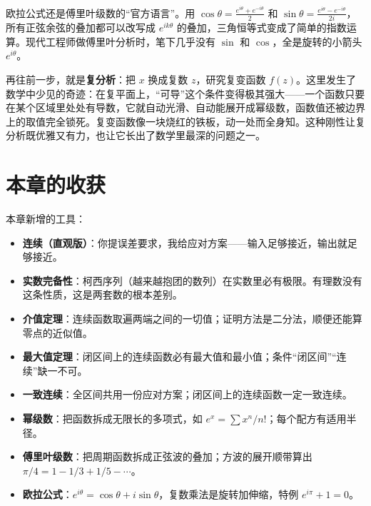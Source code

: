 欧拉公式还是傅里叶级数的“官方语言”。用 $\cos\theta=\frac{e^{i\theta}+e^{-i\theta}}{2}$ 和 $\sin\theta=\frac{e^{i\theta}-e^{-i\theta}}{2i}$，所有正弦余弦的叠加都可以改写成 $e^{ik\theta}$ 的叠加，三角恒等式变成了简单的指数运算。现代工程师做傅里叶分析时，笔下几乎没有 $\sin$ 和 $\cos$，全是旋转的小箭头 $e^{i\theta}$。

再往前一步，就是\textbf{复分析}：把 $x$ 换成复数 $z$，研究复变函数 $f(z)$。这里发生了数学中少见的奇迹：在复平面上，“可导”这个条件变得极其强大——一个函数只要在某个区域里处处有导数，它就自动光滑、自动能展开成幂级数，函数值还被边界上的取值完全锁死。复变函数像一块烧红的铁板，动一处而全身知。这种刚性让复分析既优雅又有力，也让它长出了数学里最深的问题之一。

\section{本章的收获}

\begin{toolbox}
本章新增的工具：

\begin{itemize}
  \item \textbf{连续（直观版）}：你提误差要求，我给应对方案——输入足够接近，输出就足够接近。
  \item \textbf{实数完备性}：柯西序列（越来越抱团的数列）在实数里必有极限。有理数没有这条性质，这是两套数的根本差别。
  \item \textbf{介值定理}：连续函数取遍两端之间的一切值；证明方法是二分法，顺便还能算零点的近似值。
  \item \textbf{最大值定理}：闭区间上的连续函数必有最大值和最小值；条件“闭区间”“连续”缺一不可。
  \item \textbf{一致连续}：全区间共用一份应对方案；闭区间上的连续函数一定一致连续。
  \item \textbf{幂级数}：把函数拆成无限长的多项式，如 $e^x=\sum x^n/n!$；每个配方有适用半径。
  \item \textbf{傅里叶级数}：把周期函数拆成正弦波的叠加；方波的展开顺带算出 $\pi/4=1-1/3+1/5-\cdots$。
  \item \textbf{欧拉公式}：$e^{i\theta}=\cos\theta+i\sin\theta$，复数乘法是旋转加伸缩，特例 $e^{i\pi}+1=0$。
\end{itemize}
\end{toolbox}

